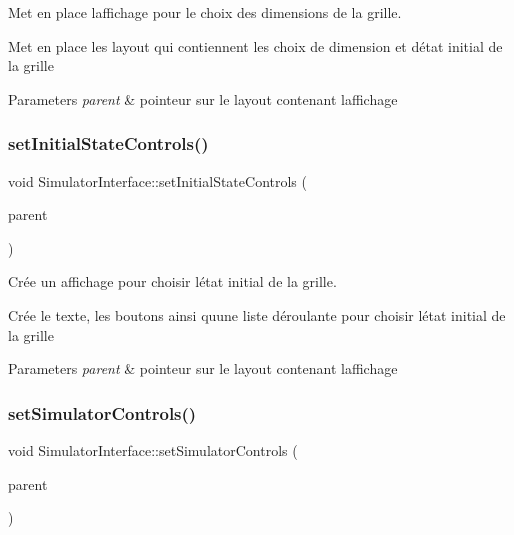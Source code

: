 Met en place l\textquotesingle{}affichage pour le choix des dimensions de la grille. 

Met en place les layout qui contiennent les choix de dimension et d\textquotesingle{}état initial de la grille 
\begin{DoxyParams}{Parameters}
{\em parent} & pointeur sur le layout contenant l\textquotesingle{}affichage \\
\hline
\end{DoxyParams}
\mbox{\label{class_simulator_interface_a27e4c2a6ac36793d3e265e367b457484}} 
\subsubsection{\texorpdfstring{set\+Initial\+State\+Controls()}{setInitialStateControls()}}
{\footnotesize\ttfamily void Simulator\+Interface\+::set\+Initial\+State\+Controls (\begin{DoxyParamCaption}\item[{Q\+Box\+Layout $\ast$}]{parent }\end{DoxyParamCaption})\hspace{0.3cm}{\ttfamily [protected]}}



Crée un affichage pour choisir l\textquotesingle{}état initial de la grille. 

Crée le texte, les boutons ainsi qu\textquotesingle{}une liste déroulante pour choisir l\textquotesingle{}état initial de la grille 
\begin{DoxyParams}{Parameters}
{\em parent} & pointeur sur le layout contenant l\textquotesingle{}affichage \\
\hline
\end{DoxyParams}
\mbox{\label{class_simulator_interface_a74b0da33c4faa1198ac70d2a0783be42}} 
\subsubsection{\texorpdfstring{set\+Simulator\+Controls()}{setSimulatorControls()}}
{\footnotesize\ttfamily void Simulator\+Interface\+::set\+Simulator\+Controls (\begin{DoxyParamCaption}\item[{Q\+Box\+Layout $\ast$}]{parent }\end{DoxyParamCaption})\hspace{0.3cm}{\ttfamily [protected]}}



